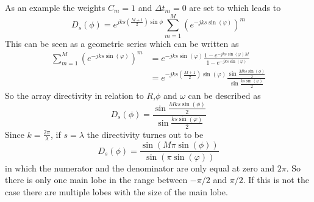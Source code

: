 As an example the weights $C_m = 1$ and $\Delta t_m = 0$ are set to which leads to
\begin{equation}
   D_s(\phi)
    = 
    e^{jks\left ( \frac{M+1}{2} \right )\sin{\phi} } \sum_{m=1}^M \left ( e^{-jks \sin{(\varphi)}} \right ) ^ m 
\end{equation}
This can be seen as a geometric series which can be written as 
\begin{align}
   \sum_{m=1}^M \left ( e^{-jks \sin{(\varphi)}} \right ) ^ m
    &= 
     e^{-jks \sin{(\varphi)}}\frac{1 - e^{-jks \sin{(\varphi) M }}}{1 - e^{-jks \sin{(\varphi)}}} \\
     &=
     e^{-jks\left ( \frac{M + 1}{2}\right ) \sin{(\varphi)}} \frac{\sin{\frac{Mks\sin{(\phi)}}{2}}}{\sin{\frac{ks\sin{(\varphi)}}{2}}}
\end{align}
So the array directivity  in relation to $R$,$\phi$ and $\omega$ can be described as
\begin{equation}
    D_s(\phi) 
    = 
    \frac{\sin{\frac{Mks\sin{(\phi)}}{2}}}{\sin{\frac{ks\sin{(\varphi)}}{2}}}
    \label{3_eq:directivity_no_delay}
\end{equation}
Since $k = \frac{2\pi}{\lambda}$, if $s = \lambda$ the directivity turnes out to be
\begin{equation}
    D_s(\phi) 
    = 
    \frac{\sin{\left ( M\pi\sin{(\phi)} \right )} }{ \sin{\left ( \pi\sin{(\varphi)}\right )}}
\end{equation}
in which the numerator and the denominator are only equal at zero and $2\pi$. So there is only one main lobe in the range between $-\pi/2$ and $\pi/2$. If this is not the case there are multiple lobes with the size of the main lobe.
